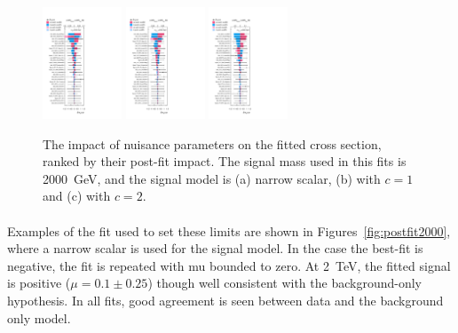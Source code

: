 \begin{figure}[htbp!]
\begin{center}
\includegraphics[width=0.21\textwidth]{figures/boosted/results/ranking_okt18_s_2000.pdf} 
\includegraphics[width=0.21\textwidth]{figures/boosted/results/ranking_okt18_g10_2000.pdf} 
\includegraphics[width=0.21\textwidth]{figures/boosted/results/ranking_okt18_g20_2000.pdf} 
\caption{The impact of nuisance parameters on the fitted cross section, ranked by their post-fit impact. The signal mass used in this fits is 2000~GeV, and the signal model is (a) narrow scalar, (b) \Grav with $c=1$ and (c) \Grav with  $c=2$.}
\label{fig:ranking2000}
\end{center}
\end{figure}


\paragraph{}
Examples of the fit used to set these limits are shown in Figures~\ref{fig:postfit2000}, where a narrow scalar is used for the signal model. 
In the case the best-fit is negative, the fit is repeated with mu bounded to zero. 
At 2~TeV, the fitted signal is positive ($\mu=0.1\pm0.25$) though well consistent with the background-only hypothesis. 
In all fits, good agreement is seen between data and the background only model.

